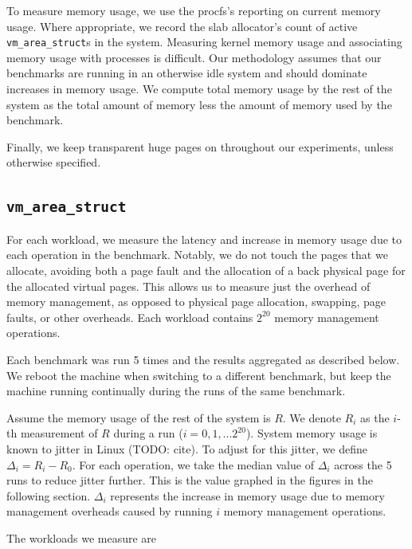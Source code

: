 \documentclass[twocolumn,11pt]{article}
\begin{document}
To measure memory usage, we use the procfs's reporting on current memory usage.
Where appropriate, we record the slab allocator's count of active
\texttt{vm\_area\_struct}s in the system. Measuring kernel memory usage and
associating memory usage with processes is difficult. Our methodology assumes
that our benchmarks are running in an otherwise idle system and should dominate
increases in memory usage.  We compute total memory usage by the rest of the
system as the total amount of memory less the amount of memory used by the
benchmark.

Finally, we keep transparent huge pages on throughout our experiments, unless
otherwise specified.

\subsection{\texttt{vm\_area\_struct}}
\label{ss_vm_area_struct}

For each workload, we measure the latency and increase in memory usage due to
each operation in the benchmark. Notably, we do not touch the pages that we
allocate, avoiding both a page fault and the allocation of a back physical page
for the allocated virtual pages. This allows us to measure just the overhead of
memory management, as opposed to physical page allocation, swapping, page
faults, or other overheads.  Each workload contains $2^{20}$ memory management
operations.

Each benchmark was run 5 times and the results aggregated as described below. We
reboot the machine when switching to a different benchmark, but keep the machine
running continually during the runs of the same benchmark. 

Assume the memory usage of the rest of the system is $R$. We denote $R_i$ as the
$i$-th measurement of $R$ during a run ($i = 0, 1, ... 2^{20}$). System memory
usage is known to jitter in Linux (TODO: cite). To adjust for this jitter, we
define $\Delta_i = R_i - R_0$. For each operation, we take the median value of
$\Delta_i$ across the 5 runs to reduce jitter further.  This is the value
graphed in the figures in the following section. $\Delta_i$ represents the
increase in memory usage due to memory management overheads caused by running
$i$ memory management operations.

The workloads we measure are
\end{document}
